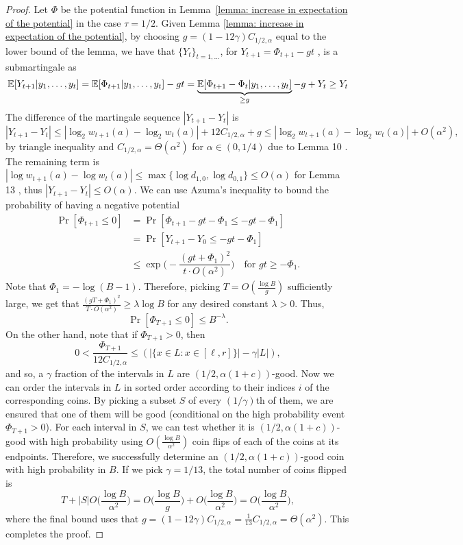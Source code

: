 \begin{proof}
Let $\Phi$ be the potential function in Lemma~\ref{lemma: increase in expectation of the potential} in the case $\tau=1/2$.
Given Lemma \ref{lemma: increase in expectation of the potential}, by choosing $g=(1-12\gamma)C_{1/2, \alpha}$ equal to the lower bound of the lemma, we have that $\{Y_{t}\}_{t=1,\dots}$, for $Y_{t+1} = \Phi_{t+1}-gt$
%
, is a submartingale as
%
%
%
\begin{equation*}
    \mathbb{E}[Y_{t+1}|y_1,\dots,y_t] = \mathbb{E}[\Phi_{t+1}|y_1,\dots, y_t]-gt = \underbrace{\mathbb{E}[\Phi_{t+1}-\Phi_t|y_1,\dots, y_t]}_{\geq g}-g +Y_{t}\geq Y_t
\end{equation*}
%
The difference of the martingale sequence $|Y_{t+1}-Y_t|$ is
\begin{equation*}
    |Y_{t+1}-Y_{t}|\leq |\log_2 w_{t+1}(a)-\log_{2}w_t(a)|+12 C_{1/2,\alpha}+g\leq  |\log_2 w_{t+1}(a)-\log_{2}w_t(a)|+O(\alpha^2),
\end{equation*}
by triangle inequality and $C_{1/2, \alpha}=\Theta(\alpha^2)$ for $\alpha\in (0,1/4)$ due to Lemma 10 \cite{gretta2023sharp}. The remaining term is 
$|\log w_{t+1}(a)-\log w_t(a)|\leq \max\{\log d_{1,0}, \log d_{0,1}\}\leq O(\alpha)$ for Lemma 13 \cite{gretta2023sharp}, thus $|Y_{t+1}-Y_t|\leq O(\alpha)$. We can use Azuma's inequality to bound the probability of having a negative potential 
\begin{align*}
    \Pr[\Phi_{t+1}\leq 0] &= \Pr[\Phi_{t+1}-gt-\Phi_1\leq -gt -\Phi_1]\\
    &=\Pr[Y_{t+1}-Y_0\leq -gt -\Phi_1]\\
    &\leq \exp\bigg(-\dfrac{(gt+\Phi_1)^2}{t\cdot O(\alpha^2)}\bigg)\quad \text{for } gt\geq -\Phi_1.
\end{align*}
Note that $\Phi_1=-\log(B-1)$. Therefore, picking $T=O\left(\frac{\log B}{g}\right)$ sufficiently large, we get that $\frac{(gT+\Phi_1)^2}{T\cdot O(\alpha^2)}\geq \lambda\log B$ for any desired constant $\lambda>0$. Thus,
\[
\Pr[\Phi_{T+1}\leq 0]\leq B^{-\lambda}.
\]
On the other hand, note that if $\Phi_{T+1}> 0$, then
\[
 0<\frac{\Phi_{T+1}}{12C_{1/2, \alpha}} \leq (|\{x\in L : x \in [\ell,r]\}|-\gamma|L|),
\]
and so, a $\gamma$ fraction of the intervals in $L$ are $(1/2,\alpha(1+c))$-good. Now we can order the intervals in $L$ in sorted order according to their indices $i$ of the corresponding coins. By picking a subset $S$ of every $(1/\gamma)$th of them, we are ensured that one of them will be good (conditional on the high probability event $\Phi_{T+1}> 0$). For each interval in $S$, we can test whether it is $(1/2,\alpha(1+c))$-good with high probability using $O(\frac{\log B}{\alpha^2})$ coin flips of each of the coins at its endpoints. Therefore, we successfully determine an $(1/2,\alpha(1+c))$-good coin with high probability in $B$. If we pick $\gamma=1/13$, the total number of coins flipped is 
\[
T+|S|O\bigg(\frac{\log B}{\alpha^2}\bigg)= O\bigg(\frac{\log B}{g}\bigg)+O\bigg(\frac{\log B}{\alpha^2}\bigg)=O\bigg(\frac{\log B}{\alpha^2}\bigg),
\]
where the final bound uses that $g=(1-12\gamma)C_{1/2, \alpha}=\frac{1}{13}C_{1/2, \alpha}=\Theta(\alpha^2)$. This completes the proof.
%
%
%
%
%
%
%
%
%
%
%
\end{proof}